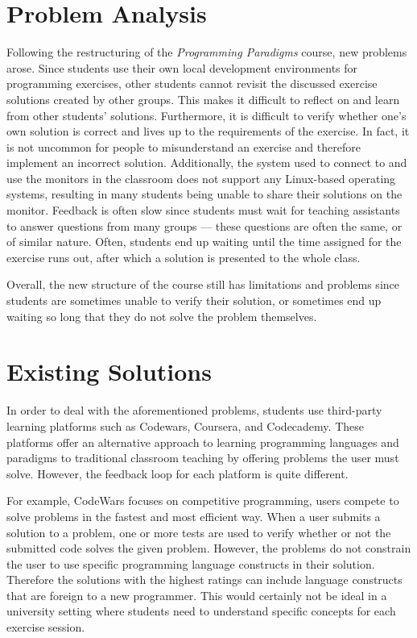 \section{Problem Analysis}
Following the restructuring of the \textit{Programming Paradigms} course, new problems arose.
Since students use their own local development environments for programming exercises, other students cannot revisit the discussed exercise solutions created by other groups.
This makes it difficult to reflect on and learn from other students' solutions.
Furthermore, it is difficult to verify whether one's own solution is correct and lives up to the requirements of the exercise.
In fact, it is not uncommon for people to misunderstand an exercise and therefore implement an incorrect solution.
Additionally, the system used to connect to and use the monitors in the classroom does not support any Linux-based operating systems, resulting in many students being unable to share their solutions on the monitor.
Feedback is often slow since students must wait for teaching assistants to answer questions from many groups --- these questions are often the same, or of similar nature.
Often, students end up waiting until the time assigned for the exercise runs out, after which a solution is presented to the whole class.

Overall, the new structure of the course still has limitations and problems since students are sometimes unable to verify their solution, or sometimes end up waiting so long that they do not solve the problem themselves.

\section{Existing Solutions}
In order to deal with the aforementioned problems, students use third-party learning platforms such as Codewars\cite{Codewars}, Coursera\cite{Coursera}, and Codecademy\cite{Codecademy}.
These platforms offer an alternative approach to learning programming languages and paradigms to traditional classroom teaching by offering problems the user must solve.
However, the feedback loop for each platform is quite different.


For example, CodeWars focuses on competitive programming, users compete to solve problems in the fastest and most efficient way.
When a user submits a solution to a problem, one or more tests are used to verify whether or not the submitted code solves the given problem.
However, the problems do not constrain the user to use specific programming language constructs in their solution.
Therefore the solutions with the highest ratings can include language constructs that are foreign to a new programmer.
This would certainly not be ideal in a university setting where students need to understand specific concepts for each exercise session.


